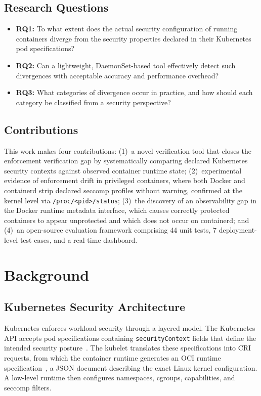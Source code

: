 \documentclass[conference]{IEEEtran}
\begin{document}
\subsection{Research Questions}

\begin{itemize}
    \item \textbf{RQ1:} To what extent does the actual security configuration of running containers diverge from the security properties declared in their Kubernetes pod specifications?
    \item \textbf{RQ2:} Can a lightweight, DaemonSet-based tool effectively detect such divergences with acceptable accuracy and performance overhead?
    \item \textbf{RQ3:} What categories of divergence occur in practice, and how should each category be classified from a security perspective?
\end{itemize}

\subsection{Contributions}

This work makes four contributions: (1)~a novel verification tool that closes the enforcement verification gap by systematically comparing declared Kubernetes security contexts against observed container runtime state; (2)~experimental evidence of enforcement drift in privileged containers, where both Docker and containerd strip declared seccomp profiles without warning, confirmed at the kernel level via \texttt{/proc/<pid>/status}; (3)~the discovery of an observability gap in the Docker runtime metadata interface, which causes correctly protected containers to appear unprotected and which does not occur on containerd; and (4)~an open-source evaluation framework comprising 44 unit tests, 7 deployment-level test cases, and a real-time dashboard.

\section{Background}

\subsection{Kubernetes Security Architecture}

Kubernetes enforces workload security through a layered model. The Kubernetes API accepts pod specifications containing \texttt{securityContext} fields that define the intended security posture~\cite{k8sseccomp2024}. The kubelet translates these specifications into CRI requests, from which the container runtime generates an OCI runtime specification~\cite{ocispec2023}, a JSON document describing the exact Linux kernel configuration. A low-level runtime then configures namespaces, cgroups, capabilities, and seccomp filters.
\end{document}
